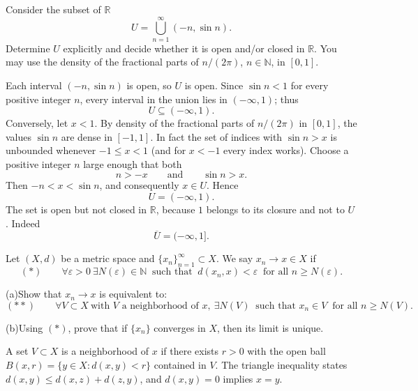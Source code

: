 \begin{problem}[CP-IV-0109]
\label{prob:cp-iv-0109}
Consider the subset of $\mathbb R$
\[
 U=\bigcup_{n=1}^{\infty}(-n,\sin n).
\]
Determine $U$ explicitly and decide whether it is open and/or closed in $\mathbb R$.
You may use the density of the fractional parts of $n/(2\pi)$, $n\in\mathbb N$, in $[0,1]$.
\end{problem}

\begin{solution}
Each interval $(-n,\sin n)$ is open, so $U$ is open.
Since $\sin n<1$ for every positive integer $n$, every interval in the union lies in $(-\infty,1)$; thus
\[
 U\subseteq(-\infty,1).
\]
Conversely, let $x<1$. By density of the fractional parts of $n/(2\pi)$ in $[0,1]$, the values $\sin n$ are dense in $[-1,1]$. In fact the set of indices with $\sin n>x$ is unbounded whenever $-1\le x<1$ (and for $x<-1$ every index works). Choose a positive integer $n$ large enough that both
\[
 n>-x\qquad\text{and}\qquad \sin n>x.
\]
Then $-n<x<\sin n$, and consequently $x\in U$. Hence
\[
 \boxed{U=(-\infty,1).}
\]
The set is open but not closed in $\mathbb R$, because $1$ belongs to its closure and not to $U$. Indeed
\[
 \overline U=(-\infty,1].
\]
\end{solution}

\begin{problem}[CP-IV-0113]
\label{prob:cp-iv-0113}
Let $(X,d)$ be a metric space and $\{x_n\}_{n=1}^\infty\subset X$. We say $x_n\to x\in X$ if
\[
(\ast)\qquad \forall \varepsilon>0\ \exists N(\varepsilon)\in\mathbb{N}\ \text{ such that }\ d(x_n,x)<\varepsilon\ \text{ for all } n\ge N(\varepsilon).
\]

\par\noindent (a)\quad Show that $x_n\to x$ is equivalent to:
\[
(\ast\ast)\qquad \forall V\subset X\ \text{with }V\text{ a neighborhood of }x,\ \exists N(V)\ \text{ such that } x_n\in V\ \text{ for all } n\ge N(V).
\]
\par\noindent (b)\quad Using $(\ast)$, prove that if $\{x_n\}$ converges in $X$, then its limit is unique.

A set $V\subset X$ is a neighborhood of $x$ if there exists $r>0$ with the open ball $B(x,r)=\{y\in X: d(x,y)<r\}$ contained in $V$. The triangle inequality states $d(x,y)\le d(x,z)+d(z,y)$, and $d(x,y)=0$ implies $x=y$.
\end{problem}

